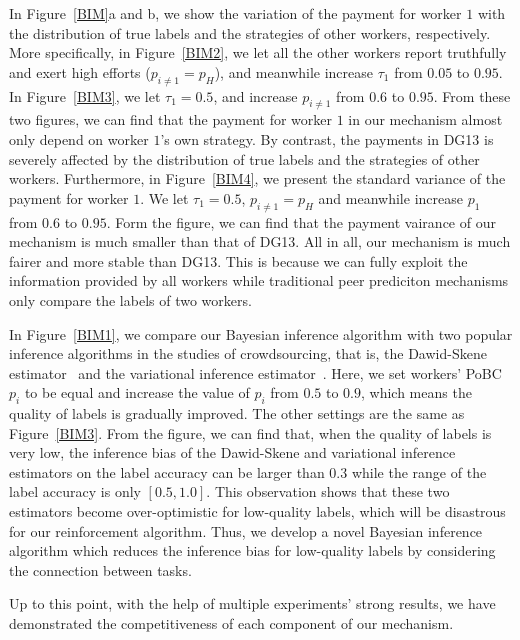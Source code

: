 In Figure~\ref{BIM}a and b, we show the variation of the payment for worker $1$ with the distribution of true labels and the strategies of other workers, respectively.
More specifically, in Figure~\ref{BIM2}, we let all the other workers report truthfully and exert high efforts ($p_{i\neq 1}=p_H$), and meanwhile increase $\tau_1$ from $0.05$ to $0.95$.
In Figure~\ref{BIM3}, we let $\tau_1=0.5$, and increase $p_{i\neq 1}$ from $0.6$ to $0.95$.
From these two figures, we can find that the payment for worker $1$ in our mechanism almost only depend on worker $1$'s own strategy.
By contrast, the payments in DG13 is severely affected by the distribution of true labels and the strategies of other workers.
Furthermore, in Figure~\ref{BIM4}, we present the standard variance of the payment for worker $1$.
We let $\tau_1=0.5$, $p_{i\neq 1}=p_H$ and meanwhile increase $p_1$ from $0.6$ to $0.95$.
Form the figure, we can find that the payment vairance of our mechanism is much smaller than that of DG13.
All in all, our mechanism is much fairer and more stable than DG13.
This is because we can fully exploit the information provided by all workers while traditional peer prediciton mechanisms only compare the labels of two workers. 


In Figure~\ref{BIM1}, we compare our Bayesian inference algorithm with two popular inference algorithms in the studies of crowdsourcing, that is, the Dawid-Skene estimator~\cite{dawid1979maximum,raykar2010learning} and the variational inference estimator~\cite{liu2012variational,chen2015statistical}.
Here, we set workers' PoBC $p_i$ to be equal and increase the value of $p_i$ from $0.5$ to $0.9$, which means the quality of labels is gradually improved.
The other settings are the same as Figure~\ref{BIM3}.
From the figure, we can find that, when the quality of labels is very low, the inference bias of the Dawid-Skene and variational inference estimators on the label accuracy can be larger than $0.3$ while the range of the label accuracy is only $[0.5,1.0]$.
This observation shows that these two estimators become over-optimistic for low-quality labels, which will be disastrous for our reinforcement algorithm.
Thus, we develop a novel Bayesian inference algorithm which reduces the inference bias for low-quality labels by considering the connection between tasks.

Up to this point, with the help of multiple experiments' strong results, we have demonstrated the competitiveness of each component of our mechanism. 

